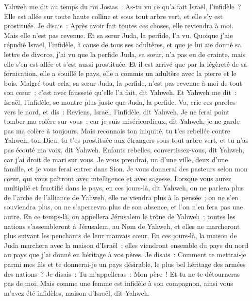 \begin{multicols}{2}
Yahweh me dit au temps du roi Josias~: As-tu vu ce qu'a fait Israël, l'infidèle~? Elle est allée sur toute haute colline et sous tout arbre vert, et elle s'y est prostituée.
Je disais~: Après avoir fait toutes ces choses, elle reviendra à moi. Mais elle n'est pas revenue. Et sa sœur Juda, la perfide, l'a vu.
Quoique j'aie répudié Israël, l'infidèle, à cause de tous ses adultères, et que je lui aie donné sa lettre de divorce, j'ai vu que la perfide Juda, sa sœur, n'a pas eu de crainte, mais elle s'en est allée et s'est aussi prostituée.
Et il est arrivé que par la légèreté de sa fornication, elle a souillé le pays, elle a commis un adultère avec la pierre et le bois.
Malgré tout cela, sa sœur Juda, la perfide, n'est pas revenue à moi de tout son cœur~; c'est avec fausseté qu'elle l'a fait, dit Yahweh.
Et Yahweh me dit~: Israël, l'infidèle, se montre plus juste que Juda, la perfide.
Va, crie ces paroles vers le nord, et dis~: Reviens, Israël, l'infidèle, dit Yahweh. Je ne ferai point tomber ma colère sur vous~; car je suis miséricordieux, dit Yahweh, je ne garde pas ma colère à toujours.
Mais reconnais ton iniquité, tu t'es rebellée contre Yahweh, ton Dieu, tu t'es prostituée aux étrangers sous tout arbre vert, et tu n'as pas écouté ma voix, dit Yahweh.
Enfants rebelles, convertissez-vous, dit Yahweh, car j'ai droit de mari sur vous. Je vous prendrai, un d'une ville, deux d'une famille, et je vous ferai entrer dans Sion.
Je vous donnerai des pasteurs selon mon cœur, qui vous paîtront avec intelligence et avec sagesse.
Lorsque vous aurez multiplié et fructifié dans le pays, en ces jours-là, dit Yahweh, on ne parlera plus de l'arche de l'alliance de Yahweh, elle ne viendra plus à la pensée~; on ne s'en souviendra plus, on ne s'apercevra plus de son absence, et l'on n'en fera pas une autre.
En ce temps-là, on appellera Jérusalem le trône de Yahweh~; toutes les nations s'assembleront à Jérusalem, au Nom de Yahweh, et elles ne marcheront plus suivant les penchants de leur mauvais cœur.
En ces jours-là, la maison de Juda marchera avec la maison d'Israël~; elles viendront ensemble du pays du nord au pays que j'ai donné en héritage à vos pères.
Je disais~: Comment te mettrai-je parmi mes fils et te donnerai-je un pays désirable, le plus bel héritage des armées des nations~? Je disais~: Tu m'appelleras~: Mon père~! Et tu ne te détourneras pas de moi.
Mais comme une femme est infidèle à son compagnon, ainsi vous m'avez été infidèles, maison d'Israël, dit Yahweh.

\end{multicols}
